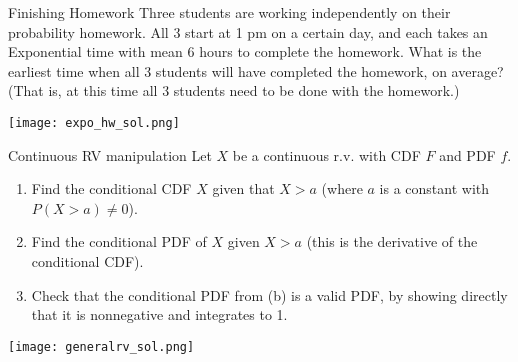 \documentclass[11.5pt]{article}
\begin{document}
 \begin{exercise}{Finishing Homework} 
 Three students are working independently on their probability homework. All 3 start at 1 pm on a certain day, and each takes an Exponential time with mean 6 hours to complete the homework. What is the earliest time when all 3 students will have completed the homework, on average?  (That is, at this time all 3 students need to be done with the homework.)
 \end{exercise}

\begin{solution}{3} 
 \texttt{[image: expo\_hw\_sol.png]}
 \end{solution} 

\begin{exercise}{Continuous RV manipulation}
Let $X$ be a continuous r.v. with CDF $F$ and PDF $f$.
\begin{enumerate}
    \item Find the conditional CDF $X$ given that $X>a$ (where $a$ is a constant with $P(X>a)\neq0$).
    \item Find the conditional PDF of $X$ given $X > a$ (this is the derivative of the conditional CDF).
    \item Check that the conditional PDF from (b) is a valid PDF, by showing directly that it is nonnegative and integrates to 1.
\end{enumerate}
\end{exercise}
\begin{solution}{2}
\texttt{[image: generalrv\_sol.png]}
\end{solution}


\end{document}
